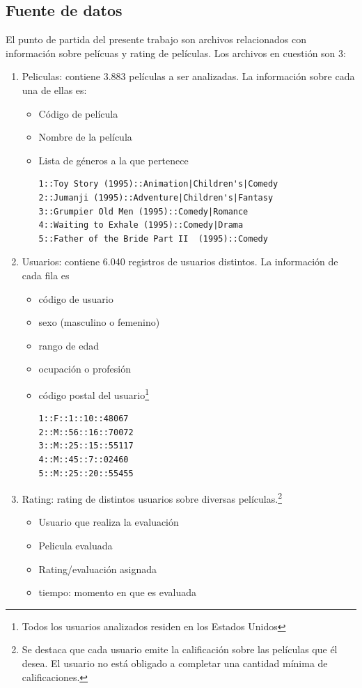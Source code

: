 \documentclass[journal]{IEEEtran}
\begin{document}
\subsection{Fuente de datos}
El punto de partida del presente trabajo son  archivos relacionados con información
sobre pelícuas y rating de películas. Los archivos en cuestión son 3:
\begin{enumerate}
	\item Peliculas: contiene 3.883 películas a ser analizadas. La información sobre cada
		una de ellas es:
		\begin{itemize}
			\item Código de película
			\item Nombre de la película
			\item Lista de géneros a la que pertenece
				\begin{lstlisting}[frame=single, breaklines=true]
1::Toy Story (1995)::Animation|Children's|Comedy
2::Jumanji (1995)::Adventure|Children's|Fantasy
3::Grumpier Old Men (1995)::Comedy|Romance
4::Waiting to Exhale (1995)::Comedy|Drama
5::Father of the Bride Part II  (1995)::Comedy
				\end{lstlisting}
		\end{itemize}


	\item Usuarios: contiene 6.040 registros de usuarios distintos. La información de cada
		fila es
		\begin{itemize}
			\item código de usuario
			\item sexo (masculino o femenino)
			\item rango de edad
			\item ocupación o profesión
			\item código postal del usuario\footnote{Todos los usuarios analizados residen 
			  en los Estados Unidos}
				\begin{lstlisting}[frame=single]
1::F::1::10::48067
2::M::56::16::70072
3::M::25::15::55117
4::M::45::7::02460
5::M::25::20::55455
				\end{lstlisting}
		\end{itemize}

	\item Rating: rating de distintos usuarios sobre diversas películas.\footnote{Se
		destaca que cada usuario emite la calificación sobre las películas que él desea. El
		usuario no está obligado a completar una cantidad mínima de calificaciones.}

		\begin{itemize}
			\item Usuario que realiza la evaluación
			\item Pelicula evaluada
			\item Rating/evaluación asignada
			\item tiempo: momento en que es evaluada


\end{itemize}
\end{enumerate}
\end{document}
